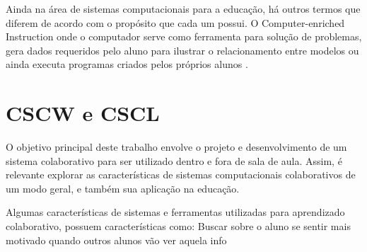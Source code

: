 Ainda na área de sistemas computacionais para a educação, há outros termos que diferem de acordo com o propósito que cada um possui. O Computer-enriched Instruction onde o computador serve como ferramenta para solução de problemas, gera dados requeridos pelo aluno para ilustrar o relacionamento entre modelos ou ainda executa programas criados pelos próprios alunos \cite{wheres proof, cotton}.


\section{CSCW e CSCL}

O objetivo principal deste trabalho envolve o projeto e desenvolvimento de um sistema colaborativo para ser utilizado dentro e fora de sala de aula. Assim, é relevante explorar as características de sistemas computacionais colaborativos de um modo geral, e também sua aplicação na educação.

Algumas características de sistemas e ferramentas utilizadas para aprendizado colaborativo, possuem características como:
Buscar sobre o aluno se sentir mais motivado quando outros alunos vão ver aquela info





